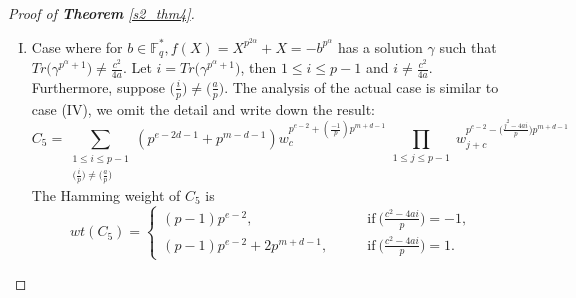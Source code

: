 \documentclass[final,1p,times]{elsarticle}
\begin{document}
\begin{proof}[Proof of \textbf{Theorem} \ref{s2_thm4}]
\begin{enumerate}[(I)]
\begin{equation*}
\begin{split}
\end{split}
\end{equation*}
Hence, we thus obtain
\begin{equation}\label{proof_thm4_hamming_weight_c4}
wt(C_{4})=
\begin{cases}
(p-1)p^{e-2},&\qquad\text{if}\ \biggl(\frac{c^{2}-4ai}{p}\biggr)=-1,\\
(p-1)p^{e-2}+2p^{m+d-1},&\qquad\text{if}\ \biggl(\frac{c^{2}-4ai}{p}\biggr)=1.
\end{cases}
\end{equation}
From Lemma \ref{sec3_npac}, the multiplicity of (\ref{proof_thm4_hamming_weight_c4}) is:
\begin{equation}\label{proof_thm4_wtmultiplicity_c4}
A_{C_{4}}=
\begin{cases}
\#N_{p}^{-}(a,c) (p^{e-2d-1}+p^{m-d-1}),&\qquad\text{if}\ \biggl(\frac{c^{2}-4ai}{p}\biggr)=-1,\\
\#N_{p}^{+}(a,c) (p^{e-2d-1}+p^{m-d-1}),&\qquad\text{if}\ \biggl(\frac{c^{2}-4ai}{p}\biggr)=1.
\end{cases}
\end{equation}
\item Case where for $ b\in \mathbb{F}_{q}^{*}, f(X)=X^{p^{2\alpha}} +X=- b^{p^{\alpha}} $ has a solution $ \gamma $ such that $ Tr\bigl(\gamma^{p^{\alpha}+1}\bigr)\ne \frac{c^{2}}{4a} $. Let $ i= Tr\bigl(\gamma^{p^{\alpha}+1}\bigr)$, then $ 1\leq i\leq p-1 $ and $ i\ne \frac{c^{2}}{4a} $. Furthermore, suppose $ \biggl(\frac{i}{p}\biggr)\ne\biggl(\frac{a}{p}\biggr) $. The analysis of the actual case is similar to case (IV), we omit the detail and write down the result:
\begin{equation}\label{proof_thm4_cwe05}
C_{5}=\sum_{\substack{1\leq i\leq p-1\\\bigl(\frac{i}{p}\bigr)\ne \bigl(\frac{a}{p}\bigr)}}(p^{e-2d-1}+p^{m-d-1}) w_{c}^{p^{e-2}+(\frac{-1}{p})p^{m+d-1}}
        \prod_{\substack{1\leq j\leq p-1}}w_{j+c}^{p^{e-2}-\bigl(\frac{j^{2}-4ai}{p}\bigr)p^{m+d-1}}
\end{equation}
The Hamming weight of $ C_{5} $ is 
\begin{equation}\label{proof_thm4_hamming_weight_c5}
wt(C_{5})=
\begin{cases}
(p-1)p^{e-2},&\qquad\text{if}\ \biggl(\frac{c^{2}-4ai}{p}\biggr)=-1,\\
(p-1)p^{e-2}+2p^{m+d-1},&\qquad\text{if}\ \biggl(\frac{c^{2}-4ai}{p}\biggr)=1.

\end{cases}
\end{equation}
\end{enumerate}
\end{proof}
\end{document}
